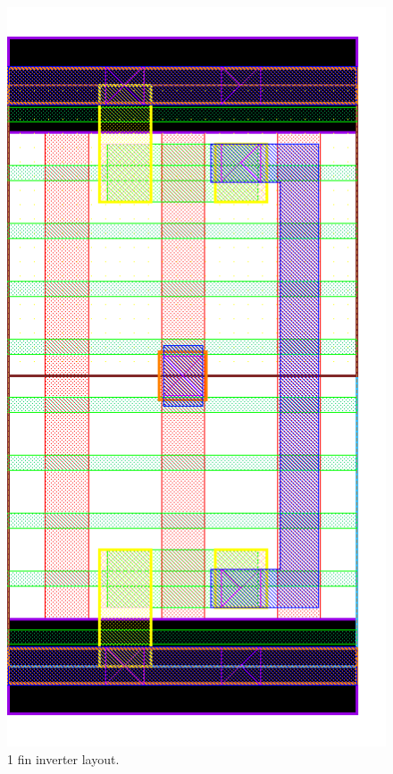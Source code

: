 \documentclass[pgmicro,mestrado,english]{iiufrgs}
\begin{document}
\begin{figure}[]
\centering
\includegraphics[width=\textwidth,height=\textheight,keepaspectratio]{INV1F.png}
\caption{1 fin inverter layout.}
\label{fig:INV1F}
\end{figure}
\end{document}
